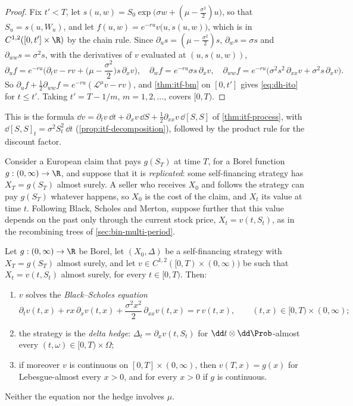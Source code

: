 \begin{proof}
Fix $t'<T$, let $s(u,w)=S_0\exp\big(\sigma w+(\mu-\frac{\sigma^2}2)u\big)$, so that
$S_u=s(u,W_u)$, and let $f(u,w)=e^{-ru}v\big(u,s(u,w)\big)$, which is in
$C^{1,2}([0,t']\times\R)$ by the chain rule. Since $\partial_us=(\mu-\frac{\sigma^2}{2})s$,
$\partial_ws=\sigma s$ and $\partial_{ww}s=\sigma^2s$, with the derivatives of $v$ evaluated at
$(u,s(u,w))$,
\[
  \partial_uf=e^{-ru}\Big(\partial_tv-rv+\Big(\mu-\frac{\sigma^2}{2}\Big)s\,\partial_xv\Big),\quad
  \partial_wf=e^{-ru}\sigma s\,\partial_xv,\quad
  \partial_{ww}f=e^{-ru}\big(\sigma^2s^2\,\partial_{xx}v+\sigma^2s\,\partial_xv\big).
\]
So $\partial_uf+\frac12\partial_{ww}f=e^{-ru}(\mathcal L^\mu v-rv)$, and \cref{thm:itf-bm} on
$[0,t']$ gives \eqref{eq:dh-ito} for $t\le t'$. Taking $t'=T-1/m$, $m=1,2,\dots$, covers
$[0,T)$.
\end{proof}

This is the formula
$\dd v=\partial_tv\,\dd t+\partial_xv\,\dd S+\frac12\partial_{xx}v\,\dd[S,S]$ of
\cref{thm:itf-process}, with $\dd[S,S]_t=\sigma^2S_t^2\,\dd t$ (\cref{prop:itf-decomposition}),
followed by the product rule for the discount factor.

Consider a European claim that pays $g(S_T)$ at time $T$, for a Borel function
$g:(0,\infty)\to\R$, and suppose that it is \emph{replicated}: some self-financing strategy has
$X_T=g(S_T)$ almost surely. A seller who receives $X_0$ and follows the strategy can pay
$g(S_T)$ whatever happens, so $X_0$ is the cost of the claim, and $X_t$ its value at time
$t$. Following Black, Scholes and Merton, suppose further that this value depends on the past
only through the current stock price, $X_t=v(t,S_t)$, as in the recombining trees of
\cref{sec:bin-multi-period}.

\begin{theorem}\label{thm:dh-bs-pde}
Let $g:(0,\infty)\to\R$ be Borel, let $(X_0,\Delta)$ be a self-financing strategy with
$X_T=g(S_T)$ almost surely, and let $v\in C^{1,2}([0,T)\times(0,\infty))$ be such that
$X_t=v(t,S_t)$ almost surely, for every $t\in[0,T)$. Then:
\begin{enumerate}[label=(\roman*)]
  \item $v$ solves the \emph{Black--Scholes equation}
    \begin{equation}\label{eq:dh-pde}
      \partial_tv(t,x)+rx\,\partial_xv(t,x)+\frac{\sigma^2x^2}{2}\,\partial_{xx}v(t,x)=r\,v(t,x),
      \qquad(t,x)\in[0,T)\times(0,\infty);
    \end{equation}
  \item the strategy is the \emph{delta hedge}: $\Delta_t=\partial_xv(t,S_t)$ for
    $\dd t\otimes\dd\Prob$-almost every $(t,\omega)\in[0,T)\times\Omega$;
  \item if moreover $v$ is continuous on $[0,T]\times(0,\infty)$, then $v(T,x)=g(x)$ for
    Lebesgue-almost every $x>0$, and for every $x>0$ if $g$ is continuous.
\end{enumerate}
Neither the equation nor the hedge involves $\mu$.
\end{theorem}


